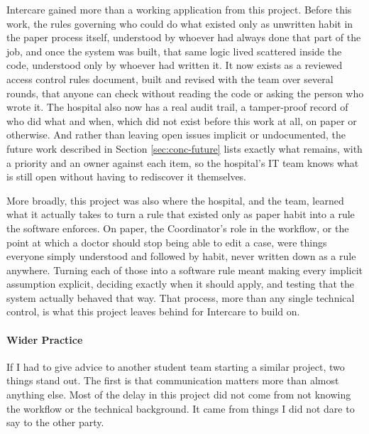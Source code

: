 Intercare gained more than a working application from this project. Before this work, the rules governing who could do what existed only as unwritten habit in the paper process itself, understood by whoever had always done that part of the job, and once the system was built, that same logic lived scattered inside the code, understood only by whoever had written it. It now exists as a reviewed access control rules document, built and revised with the team over several rounds, that anyone can check without reading the code or asking the person who wrote it. The hospital also now has a real audit trail, a tamper-proof record of who did what and when, which did not exist before this work at all, on paper or otherwise. And rather than leaving open issues implicit or undocumented, the future work described in Section \ref{sec:conc-future} lists exactly what remains, with a priority and an owner against each item, so the hospital's IT team knows what is still open without having to rediscover it themselves.

More broadly, this project was also where the hospital, and the team, learned what it actually takes to turn a rule that existed only as paper habit into a rule the software enforces. On paper, the Coordinator's role in the workflow, or the point at which a doctor should stop being able to edit a case, were things everyone simply understood and followed by habit, never written down as a rule anywhere. Turning each of those into a software rule meant making every implicit assumption explicit, deciding exactly when it should apply, and testing that the system actually behaved that way. That process, more than any single technical control, is what this project leaves behind for Intercare to build on.

\paragraph{Wider Practice}

If I had to give advice to another student team starting a similar project, two things stand out. The first is that communication matters more than almost anything else. Most of the delay in this project did not come from not knowing the workflow or the technical background. It came from things I did not dare to say to the other party.

